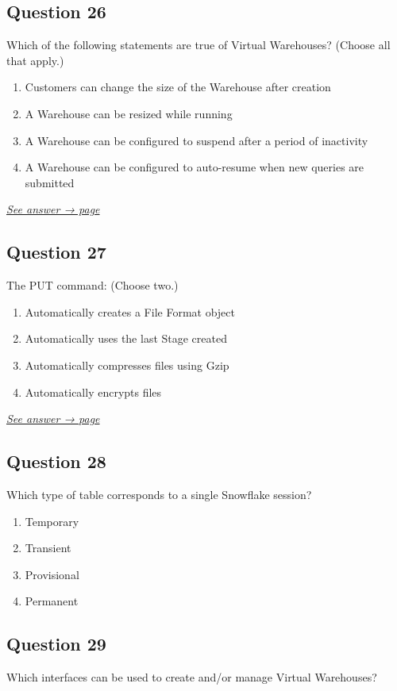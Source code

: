 \documentclass[12pt]{article}
\newcommand{\seeanswer}[1]{%
  \par\smallskip\emph{\hyperref[ans:#1]{See answer → page \pageref{ans:#1}}}%
}
\begin{document}
\subsection*{Question 26}\label{q:26}
Which of the following statements are true of Virtual Warehouses? (Choose all that apply.)

\begin{enumerate}[label=\Alph*.]
  \item Customers can change the size of the Warehouse after creation
  \item A Warehouse can be resized while running
  \item A Warehouse can be configured to suspend after a period of inactivity
  \item A Warehouse can be configured to auto-resume when new queries are submitted
\end{enumerate}
\seeanswer{26}

\subsection*{Question 27}\label{q:27}
The PUT command: (Choose two.)

\begin{enumerate}[label=\Alph*.]
  \item Automatically creates a File Format object
  \item Automatically uses the last Stage created
  \item Automatically compresses files using Gzip
  \item Automatically encrypts files
\end{enumerate}
\seeanswer{27}

\subsection*{Question 28}
Which type of table corresponds to a single Snowflake session?

\begin{enumerate}[label=\Alph*.]
  \item Temporary
  \item Transient
  \item Provisional
  \item Permanent
\end{enumerate}

\subsection*{Question 29}
Which interfaces can be used to create and/or manage Virtual Warehouses?
\end{document}
